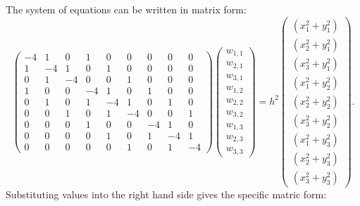 The system of equations can be written in matrix form:
\[\left(\begin{array}{ccccccccc}
-4& 1 & 0 &1 &0 &0 &0 &0 &0\\
1&-4& 1 & 0 &1 &0 &0 &0 &0 \\
0 &1&-4&  0&0 &1 &0 &0 &0 \\
1 &0 &0 &-4& 1 & 0 &1 &0 &0\\
0 & 1 &0 &1&-4& 1 &0 &1 &0  \\
0 &0 &1 &0 &1&-4&0&  0 &1  \\
0&0&0&1 &0 &0 &-4& 1 & 0\\
0&0&0&0 & 1 &0 &1&-4& 1   \\
0&0&0&0 &0 &1 &0 &1&-4
\end{array}\right)
\left(\begin{array}{c}
w_{1,1}\\
w_{2,1}\\
w_{3,1}\\
w_{1,2}\\
w_{2,2}\\
w_{3,2}\\
w_{1,3}\\
w_{2,3}\\
w_{3,3}
\end{array}\right)=
h^2\left(\begin{array}{c}
(x_1^2+y_1^2)\\
(x_2^2+y_1^2)\\
(x_3^2+y_1^2)\\
(x_1^2+y_2^2)\\
(x_2^2+y_2^2)\\
(x_3^2+y_2^2)\\
(x_1^2+y_3^2)\\
(x_2^2+y_3^2)\\
(x_3^2+y_3^2)
\end{array}\right).
\]	
Substituting values into the right hand side gives the specific matric form:
